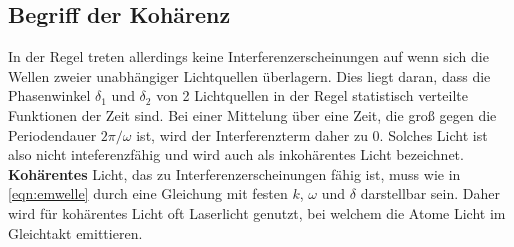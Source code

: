 \subsection{Begriff der Kohärenz}
In der Regel treten allerdings keine Interferenzerscheinungen auf wenn sich die Wellen zweier unabhängiger Lichtquellen überlagern. Dies liegt daran, dass die Phasenwinkel $\delta_1$ und $\delta_2$ von 2 Lichtquellen in der Regel statistisch verteilte Funktionen der Zeit sind. Bei einer Mittelung über eine Zeit, die groß
gegen die Periodendauer $2\pi/\omega$ ist, wird der Interferenzterm daher zu 0. Solches Licht ist also nicht inteferenzfähig und wird auch als inkohärentes Licht bezeichnet. \textbf{Kohärentes} Licht, das zu Interferenzerscheinungen fähig ist, muss wie in \autoref{eqn:emwelle} durch eine Gleichung mit festen $k$, $\omega$ und $\delta$ darstellbar sein. Daher wird für kohärentes Licht oft Laserlicht genutzt, bei welchem die Atome Licht im Gleichtakt emittieren.

